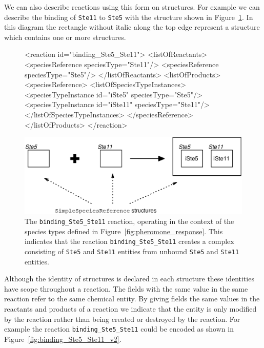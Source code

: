 \documentclass{cekarticle}
\begin{document}
We can also describe reactions using this form on
 structures.  For example we can describe
the binding of \texttt{Ste11} to \texttt{Ste5} with the
 structure shown in
Figure~\ref{fig:binding_Ste5_Ste11}. In this diagram the rectangle
without italic along the top edge represent a
 structure which contains one or
more  structures.

\begin{figure}[h]
\begin{example}
<reaction id="binding_Ste5_Ste11">
    <listOfReactants>
        <speciesReference speciesType="Ste11"/>
        <speciesReference speciesType="Ste5"/>
    </listOfReactants>
    <listOfProducts>
        <speciesReference>
            <listOfSpeciesTypeInstances>
                <speciesTypeInstance id="iSte5" speciesType="Ste5"/>
                <speciesTypeInstance id="iSte11" speciesType="Ste11"/>
            </listOfSpeciesTypeInstances>
        </speciesReference>
    </listOfProducts>
</reaction>
\end{example}
  \vspace*{8pt}
  \centering
  \includegraphics[scale = 0.7]{binding_Ste5_Ste11.eps}
  \caption{
The \texttt{binding\_Ste5\_Ste11} reaction, operating in the
context of the species types defined in
Figure~\ref{fig:pheromone_response}.  This indicates that the
reaction \texttt{binding\_Ste5\_Ste11} creates a complex
consisting of \texttt{Ste5} and \texttt{Ste11} entities from
unbound \texttt{Ste5} and \texttt{Ste11} entities.}
  \label{fig:binding_Ste5_Ste11}
\end{figure}

Although the identity of  structures is
declared in each  structure these
identities have scope throughout a reaction. The
  fields with the same value
in the same reaction refer to the same chemical entity.  By giving
  fields the same values in
the reactants and products of a reaction we indicate that the
entity is only modified by the reaction rather than being created
or destroyed by the reaction.  For example the reaction
\texttt{binding\_Ste5\_Ste11} could be encoded as shown in
Figure~\ref{fig:binding_Ste5_Ste11_v2}.
\end{document}
